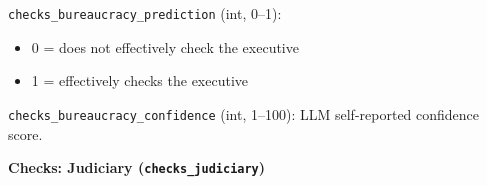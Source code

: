 \documentclass[11pt, a4paper]{article}
\newenvironment{promptquote}{%
  \begin{quote}\small
}{%
  \end{quote}
}
\begin{document}



\texttt{checks\_bureaucracy\_prediction} (int, 0--1):
\begin{itemize}[nosep, leftmargin=1.7em]
  \item 0 = does not effectively check the executive
  \item 1 = effectively checks the executive
\end{itemize}
\texttt{checks\_bureaucracy\_confidence} (int, 1--100): LLM self-reported confidence score.

\bigskip
\textbf{Checks: Judiciary (\texttt{checks\_judiciary})}



\end{document}
